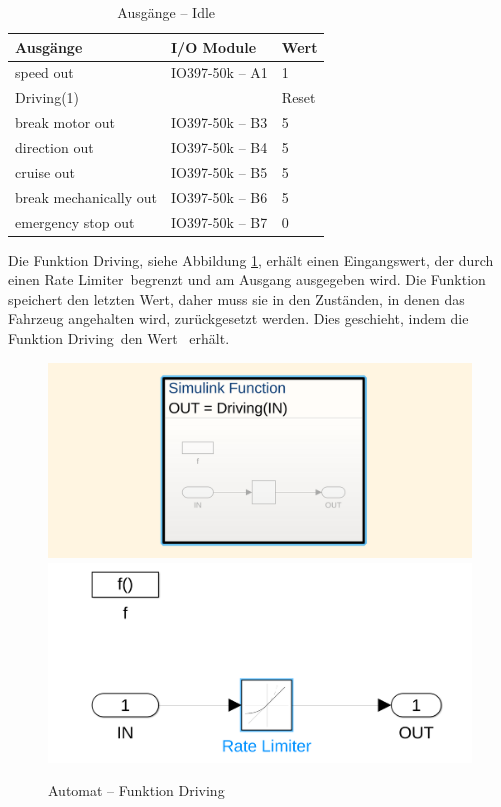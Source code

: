 \pagebreak[1]
\begin{table}[!ht]
	\centering
	\caption{Ausgänge – Idle}
	\label{Automat_man:tab:z_idle}
	\begin{tabular}{lll}
		\hline
		\textbf{Ausgänge}                           & \textbf{I/O Module}                 & \textbf{Wert} \\ \hline
		\multicolumn{1}{l|}{speed out}              & \multicolumn{1}{l|}{IO397-50k – A1} & 1             \\
		\multicolumn{1}{l|}{Driving(1)}             & \multicolumn{1}{l|}{}               & Reset         \\
		\multicolumn{1}{l|}{break motor out}        & \multicolumn{1}{l|}{IO397-50k – B3} & 5             \\
		\multicolumn{1}{l|}{direction out}          & \multicolumn{1}{l|}{IO397-50k – B4} & 5             \\
		\multicolumn{1}{l|}{cruise out}             & \multicolumn{1}{l|}{IO397-50k – B5} & 5             \\
		\multicolumn{1}{l|}{break mechanically out} & \multicolumn{1}{l|}{IO397-50k – B6} & 5             \\
		\multicolumn{1}{l|}{emergency stop out}     & \multicolumn{1}{l|}{IO397-50k – B7} & 0             \\ \hline
	\end{tabular}
\end{table}
\pagebreak[1]

Die Funktion \frqq Driving\flqq, siehe Abbildung \ref{Automat:img:fnc_Driving}, erhält einen Eingangswert, der durch einen \frqq Rate Limiter\flqq\ begrenzt und am Ausgang ausgegeben wird. Die Funktion speichert den letzten Wert, daher muss sie in den Zuständen, in denen das Fahrzeug angehalten wird, zurückgesetzt werden. Dies geschieht, indem die Funktion \frqq Driving\flqq\ den Wert \flqq\ erhält.\\

\pagebreak[1]
\begin{figure}[!ht]
	\begin{center}
		\includegraphics[width=.5\textwidth]{img/5_simulation/Automat_funktion_1.png}
		\includegraphics[width=.75\textwidth]{img/5_simulation/Automat_funktion_2.png}
		\caption{Automat – Funktion Driving}
		\label{Automat:img:fnc_Driving}
	\end{center}
\end{figure}
\pagebreak[4]

